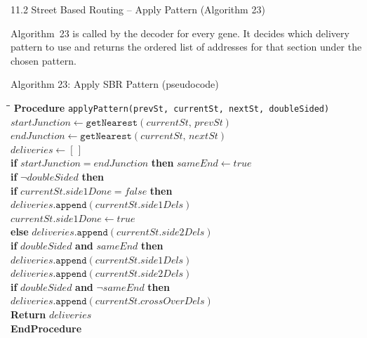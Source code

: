 \documentclass[aspectratio=169,10pt]{beamer}
\begin{document}
\begin{frame}[allowframebreaks]{11.2 Street Based Routing -- Apply Pattern (Algorithm 23)}

  Algorithm~23 is called by the decoder for every gene.  It decides which
  delivery pattern to use and returns the ordered list of addresses for that
  section under the chosen pattern.

  \begin{block}{Algorithm 23: Apply SBR Pattern (pseudocode)}
    \begin{footnotesize}
    \begin{tabbing}
      \hspace{2em}\=\hspace{2em}\=\hspace{2em}\=\kill
      \textbf{Procedure} \texttt{applyPattern(prevSt, currentSt, nextSt, doubleSided)} \\
      \> $startJunction \leftarrow \mathtt{getNearest}(currentSt,\, prevSt)$ \\
      \> $endJunction \leftarrow \mathtt{getNearest}(currentSt,\, nextSt)$ \\
      \> $deliveries \leftarrow [\,]$ \\
      \> \textbf{if} $startJunction = endJunction$ \textbf{then} $sameEnd \leftarrow \mathit{true}$ \\
      \> \textbf{if} $\neg doubleSided$ \textbf{then} \\
      \>\> \textbf{if} $currentSt.side1Done = \mathit{false}$ \textbf{then} \\
      \>\>\> $deliveries.\mathtt{append}(currentSt.side1Dels)$ \\
      \>\>\> $currentSt.side1Done \leftarrow \mathit{true}$ \\
      \>\> \textbf{else} $deliveries.\mathtt{append}(currentSt.side2Dels)$ \\
      \> \textbf{if} $doubleSided$ \textbf{and} $sameEnd$ \textbf{then} \\
      \>\> $deliveries.\mathtt{append}(currentSt.side1Dels)$ \\
      \>\> $deliveries.\mathtt{append}(currentSt.side2Dels)$ \\
      \> \textbf{if} $doubleSided$ \textbf{and} $\neg sameEnd$ \textbf{then} \\
      \>\> $deliveries.\mathtt{append}(currentSt.crossOverDels)$ \\
      \> \textbf{Return} $deliveries$ \\
      \textbf{EndProcedure}
    \end{tabbing}
    \end{footnotesize}
  \end{block}


\end{frame}
\end{document}
